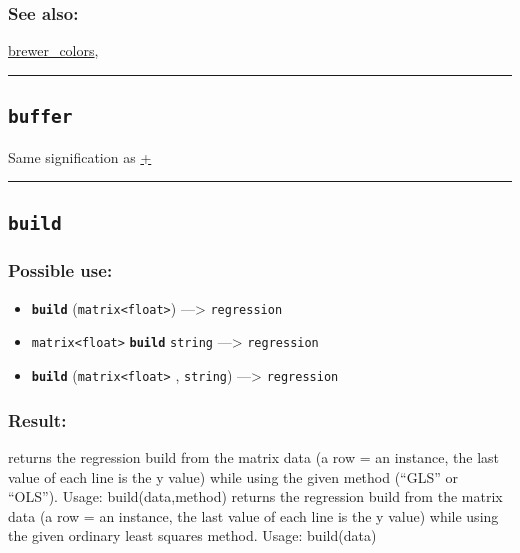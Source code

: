 \documentclass[]{book}
\providecommand{\tightlist}{%
  \setlength{\itemsep}{0pt}\setlength{\parskip}{0pt}}
\theoremstyle{definition}
\theoremstyle{definition}
\theoremstyle{definition}
\theoremstyle{remark}
\begin{document}
\subsubsection{See also:}\label{see-also-49}

\href{OperatorsBC\#brewer_colors}{brewer\_colors},

\begin{center}\rule{0.5\linewidth}{\linethickness}\end{center}

\subsection{\texorpdfstring{\texttt{buffer}}{buffer}}\label{buffer}

Same signification as \href{OperatorsAA\#+}{+}

\begin{center}\rule{0.5\linewidth}{\linethickness}\end{center}

\subsection{\texorpdfstring{\texttt{build}}{build}}\label{build}

\subsubsection{Possible use:}\label{possible-use-79}

\begin{itemize}
\tightlist
\item
  \textbf{\texttt{build}}
  (\texttt{matrix\textless{}float\textgreater{}}) ---\textgreater{}
  \texttt{regression}
\item
  \texttt{matrix\textless{}float\textgreater{}} \textbf{\texttt{build}}
  \texttt{string} ---\textgreater{} \texttt{regression}
\item
  \textbf{\texttt{build}} (\texttt{matrix\textless{}float\textgreater{}}
  , \texttt{string}) ---\textgreater{} \texttt{regression}
\end{itemize}

\subsubsection{Result:}\label{result-78}

returns the regression build from the matrix data (a row = an instance,
the last value of each line is the y value) while using the given method
(``GLS'' or ``OLS''). Usage: build(data,method) returns the regression
build from the matrix data (a row = an instance, the last value of each
line is the y value) while using the given ordinary least squares
method. Usage: build(data)
\end{document}
